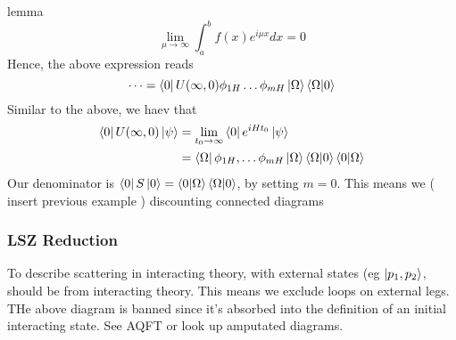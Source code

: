 lemma
\[
	\lim_{ \mu \to \infty } \int _ a ^ b f( x) e ^{ i \mu x } dx  =0 
\] Hence, the above expression reads 
\[
	\dots = \bra{ 0 } U ( \infty, 0 ) \phi_{ 1H } \dots \phi_{ m H } \ket{ \Omega }\bra{ \Omega }\ket{ 0 } 
\] Similar to the above, we haev that 
\begin{align*}
	\bra{ 0 } U ( \infty, 0 ) \ket{ \psi } &=  \lim_{ t_0 \to \infty } 
	\bra{ 0 } e ^{ i H t_0 } \ket{\psi }  \\
	&=  \bra{ \Omega } \phi_{ 1H } , \dots \phi_{ m H } \ket{ \Omega } 
	\bra{ \Omega }\ket{ 0 } \bra{  0 }\ket{ \Omega } \\ 
\end{align*}
Our denominator is $ \bra{ 0 } S \ket{ 0 } = \bra{ 0 } \ket{ \Omega } \bra{ \Omega } \ket{ 0 } $, 
by setting $ m = 0 $. 
This means we ( insert previous example ) discounting connected diagrams 

\subsubsection{LSZ Reduction} 
To describe scattering in interacting theory, with external states (eg 
 $ \ket{ p_1 , p_2 } $, should be from interacting theory. This means we 
 exclude loops on external legs. 
THe above diagram is banned since it's absorbed into 
the definition of an initial interacting state. See AQFT or look up 
amputated diagrams. 
